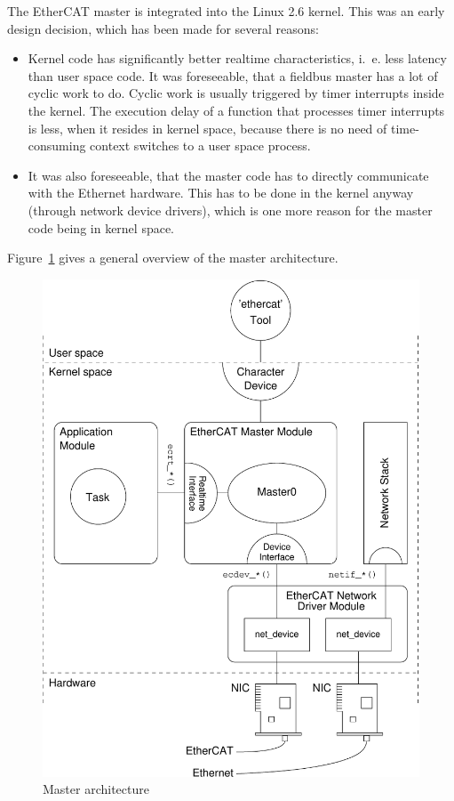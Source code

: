 \documentclass[a4paper,12pt,BCOR6mm,bibtotoc,idxtotoc]{scrbook}
\begin{document}
The EtherCAT master is integrated into the Linux 2.6 kernel. This was
an early design decision, which has been made for several reasons:

\begin{itemize}

\item Kernel code has significantly better realtime characteristics, i.~e.
less latency than user space code. It was foreseeable, that a fieldbus master
has a lot of cyclic work to do. Cyclic work is usually triggered by timer
interrupts inside the kernel. The execution delay of a function that processes
timer interrupts is less, when it resides in kernel space, because there is no
need of time-consuming context switches to a user space process.

\item It was also foreseeable, that the master code has to directly
communicate with the Ethernet hardware. This has to be done in the kernel
anyway (through network device drivers), which is one more reason for the
master code being in kernel space.

\end{itemize}

Figure~\ref{fig:arch} gives a general overview of the master architecture.

\begin{figure}[htbp]
  \centering
  \includegraphics[width=.9\textwidth]{images/architecture}
  \caption{Master architecture}
  \label{fig:arch}
\end{figure}
\end{document}
